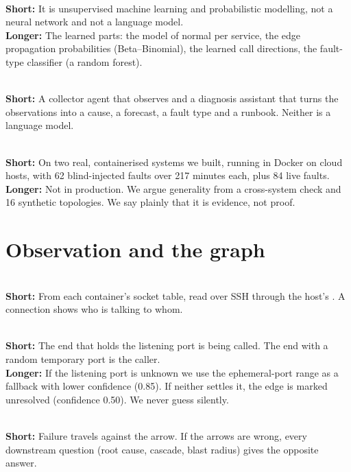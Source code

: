 \\
\textbf{Short:} It is unsupervised machine learning and probabilistic modelling, not a neural network and not a language model.\\
\textbf{Longer:} The learned parts: the model of normal per service, the edge propagation probabilities (Beta--Binomial), the learned call directions, the fault-type classifier (a random forest).

\\
\textbf{Short:} A collector agent that observes and a diagnosis assistant that turns the observations into a cause, a forecast, a fault type and a runbook. Neither is a language model.

\\
\textbf{Short:} On two real, containerised systems we built, running in Docker on cloud hosts, with 62 blind-injected faults over 217 minutes each, plus 84 live faults.\\
\textbf{Longer:} Not in production. We argue generality from a cross-system check and 16 synthetic topologies. We say plainly that it is evidence, not proof.

\section{Observation and the graph}

\\
\textbf{Short:} From each container's socket table, read over SSH through the host's . A connection shows who is talking to whom.

\\
\textbf{Short:} The end that holds the listening port is being called. The end with a random temporary port is the caller.\\
\textbf{Longer:} If the listening port is unknown we use the ephemeral-port range as a fallback with lower confidence (0.85). If neither settles it, the edge is marked unresolved (confidence 0.50). We never guess silently.

\\
\textbf{Short:} Failure travels against the arrow. If the arrows are wrong, every downstream question (root cause, cascade, blast radius) gives the opposite answer.

